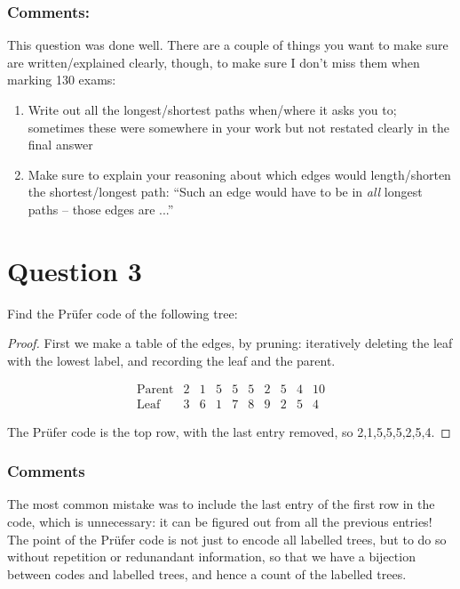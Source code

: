 \documentclass{amsart}
\begin{document}
\subsubsection*{Comments:} This question was done well.  There are a couple of things you want to make sure are written/explained clearly, though, to make sure I don't miss them when marking 130 exams:
\begin{enumerate}
\item Write out all the longest/shortest paths when/where it asks you to; sometimes these were somewhere in your work but not restated clearly in the final answer
\item Make sure to explain your reasoning about which edges would length/shorten the shortest/longest path: ``Such an edge would have to be in \emph{all} longest paths -- those edges are ...''
\end{enumerate}

\section*{Question 3}
Find the Pr\"ufer code of the following tree:
\begin{center}
\end{center}

\begin{proof}
First we make a table of the edges, by pruning: iteratively deleting the leaf with the lowest label, and recording the leaf and the parent.  

$$\begin{array}{r|cccccccccc}
\text{Parent} & 2 & 1 & 5 & 5 & 5 &2 &5 &4 & 10 \\
\hline
\text{Leaf} & 3 & 6 & 1 & 7 & 8 & 9 & 2 & 5 & 4
\end{array}$$

The Pr\"ufer code is the top row, with the last entry removed, so 2,1,5,5,5,2,5,4.
\end{proof}
\subsubsection*{Comments}
The most common mistake was to include the last entry of the first row in the code, which is unnecessary: it can be figured out from all the previous entries!  The point of the Pr\"ufer code is not just to encode all labelled trees, but to do so without repetition or redunandant information, so that we have a bijection between codes and labelled trees, and hence a count of the labelled trees.
\end{document}
